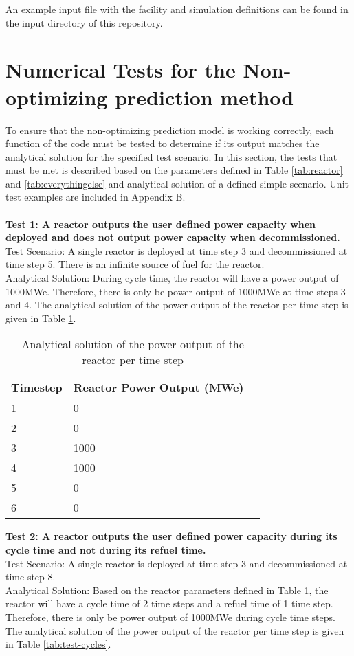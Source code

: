 \documentclass[12pt,letterpaper]{article}
\begin{document}
An example input file with the facility and simulation
definitions can be found in the input directory of this repository.

\newpage

\section{Numerical Tests for the Non-optimizing prediction method}
To ensure that the non-optimizing prediction model is working correctly, each function of the code must be tested to determine if its output matches the analytical solution for the specified test scenario. In this section, the tests that must be met is described based on the parameters defined in Table \ref{tab:reactor} and \ref{tab:everythingelse} and analytical solution of a defined simple scenario. Unit test examples are included in Appendix B.
\\
\\
\noindent
\textbf{Test 1: A reactor outputs the user defined power capacity when deployed and does not output
power capacity when decommissioned.} \\
Test Scenario: A single reactor is deployed at time step 3 and decommissioned at time step 5. There is an infinite source of fuel for the reactor. \\
Analytical Solution: During cycle time, the reactor will have a power output of 1000MWe. Therefore,
there is only be power output of 1000MWe at time steps 3 and 4. The analytical solution of
the power output of the reactor per time step is given in Table \ref{tab:test-power}.

\begin{table}[H]
     \centering
    \begin{tabularx}{\textwidth}{bbb}
       \hline
       Timestep & Reactor Power Output (MWe) \\
       \hline
       1 & 0 \\
       2 & 0 \\
       3 & 1000 \\
       4 & 1000 \\
       5 & 0 \\
       6 & 0 \\
       \hline
    \end{tabularx}
    \caption {Analytical solution of the power output of the reactor per time step}
    \label{tab:test-power}
\end{table}

\noindent
\textbf{Test 2: A reactor outputs the user defined power capacity during its cycle time and not during its refuel time.} \\
Test Scenario: A single reactor is deployed at time step 3 and decommissioned at time step 8. \\
Analytical Solution: Based on the reactor parameters defined in Table 1, the reactor will have a cycle time of 2 time steps and a refuel time of 1 time step. Therefore, there is only be power output of 1000MWe during cycle time steps. The analytical solution of the power output of the reactor per time step is given in Table \ref{tab:test-cycles}.
\end{document}
